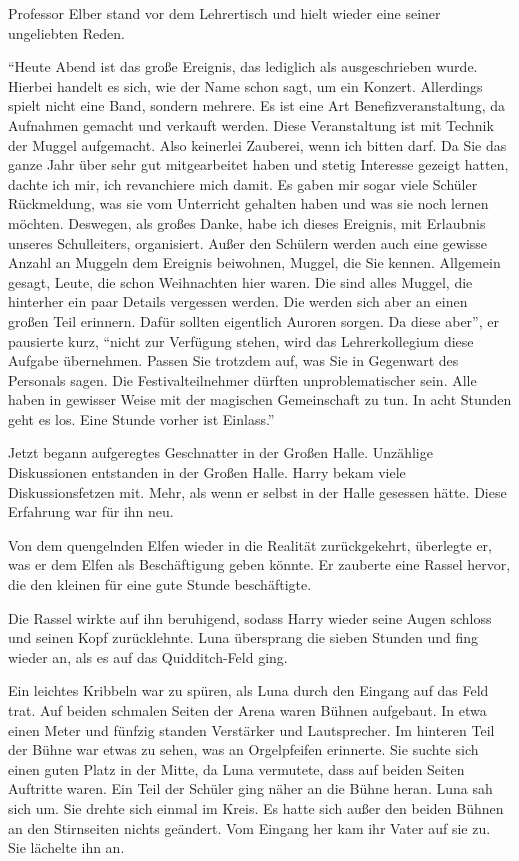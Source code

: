 \begin{rueckblick}
Professor Elber stand vor dem Lehrertisch und hielt wieder eine seiner ungeliebten Reden.

\enquote{Heute Abend ist das große Ereignis, das lediglich als  ausgeschrieben wurde. Hierbei handelt es sich, wie der Name schon sagt, um ein Konzert. Allerdings spielt nicht eine Band, sondern mehrere. Es ist eine Art Benefizveranstaltung, da Aufnahmen gemacht und verkauft werden. Diese Veranstaltung ist mit Technik der Muggel aufgemacht. Also keinerlei Zauberei, wenn ich bitten darf. \gst Da Sie das ganze Jahr über sehr gut mitgearbeitet haben und stetig Interesse gezeigt hatten, dachte ich mir, ich revanchiere mich damit. Es gaben mir sogar viele Schüler Rückmeldung, was sie vom Unterricht gehalten haben und was sie noch lernen möchten. Deswegen, als großes Danke, habe ich dieses Ereignis, mit Erlaubnis unseres Schulleiters, organisiert. Außer den Schülern werden auch eine gewisse Anzahl an Muggeln dem Ereignis beiwohnen, Muggel, die Sie kennen. Allgemein gesagt, Leute, die schon Weihnachten hier waren. \gst Die  sind alles Muggel, die hinterher ein paar Details vergessen werden. Die werden sich aber an einen großen Teil erinnern. Dafür sollten eigentlich Auroren sorgen. Da diese aber}, er pausierte kurz, \enquote{nicht zur Verfügung stehen, wird das Lehrerkollegium diese Aufgabe übernehmen. Passen Sie trotzdem auf, was Sie in Gegenwart des Personals sagen. Die Festivalteilnehmer dürften unproblematischer sein. Alle haben in gewisser Weise mit der magischen Gemeinschaft zu tun. In acht Stunden geht es los. Eine Stunde vorher ist Einlass.}

Jetzt begann aufgeregtes Geschnatter in der Großen Halle. Unzählige Diskussionen entstanden in der Großen Halle. Harry bekam viele Diskussionsfetzen mit. Mehr, als wenn er selbst in der Halle gesessen hätte. Diese Erfahrung war für ihn neu.
\end{rueckblick}

Von dem quengelnden Elfen wieder in die Realität zurückgekehrt, überlegte er, was er dem Elfen als Beschäftigung geben könnte. Er zauberte eine Rassel hervor, die den kleinen für eine gute Stunde beschäftigte.

Die Rassel wirkte auf ihn beruhigend, sodass Harry wieder seine Augen schloss und seinen Kopf zurücklehnte. Luna übersprang die sieben Stunden und fing wieder an, als es auf das Quidditch-Feld ging.

\begin{rueckblick}
Ein leichtes Kribbeln war zu spüren, als Luna durch den Eingang auf das Feld trat. Auf beiden schmalen Seiten der Arena waren Bühnen aufgebaut. In etwa einen Meter und fünfzig standen Verstärker und Lautsprecher. Im hinteren Teil der Bühne war etwas zu sehen, was an Orgelpfeifen erinnerte. Sie suchte sich einen guten Platz in der Mitte, da Luna vermutete, dass auf beiden Seiten Auftritte waren. Ein Teil der Schüler ging näher an die Bühne heran. Luna sah sich um. Sie drehte sich einmal im Kreis. Es hatte sich außer den beiden Bühnen an den Stirnseiten nichts geändert. Vom Eingang her kam ihr Vater auf sie zu. Sie lächelte ihn an.
\end{rueckblick}

